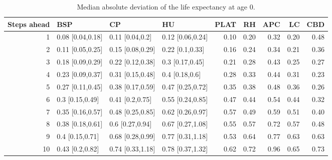 % 
\begin{table}[ht]
\centering
\begin{tabular}{rlllrrrrr}
  \hline
Steps ahead & BSP & CP & HU & PLAT & RH & APC & LC & CBD \\ 
  \hline
  1 & 0.08 [0.04,0.18] & 0.11 [0.04,0.2] & 0.12 [0.06,0.24] & 0.10 & 0.20 & 0.32 & 0.20 & 0.48 \\ 
    2 & 0.11 [0.05,0.25] & 0.15 [0.08,0.29] & 0.22 [0.1,0.33] & 0.16 & 0.24 & 0.34 & 0.21 & 0.36 \\ 
    3 & 0.18 [0.09,0.29] & 0.22 [0.12,0.38] & 0.3 [0.17,0.45] & 0.21 & 0.28 & 0.43 & 0.25 & 0.27 \\ 
    4 & 0.23 [0.09,0.37] & 0.31 [0.15,0.48] & 0.4 [0.18,0.6] & 0.28 & 0.33 & 0.44 & 0.31 & 0.23 \\ 
    5 & 0.27 [0.11,0.45] & 0.38 [0.17,0.59] & 0.47 [0.25,0.72] & 0.35 & 0.38 & 0.48 & 0.36 & 0.26 \\ 
    6 & 0.3 [0.15,0.49] & 0.41 [0.2,0.75] & 0.55 [0.24,0.85] & 0.47 & 0.44 & 0.54 & 0.44 & 0.32 \\ 
    7 & 0.35 [0.16,0.57] & 0.48 [0.25,0.85] & 0.62 [0.26,0.97] & 0.57 & 0.49 & 0.59 & 0.51 & 0.40 \\ 
    8 & 0.38 [0.18,0.61] & 0.6 [0.27,0.94] & 0.67 [0.27,1.08] & 0.55 & 0.57 & 0.72 & 0.57 & 0.48 \\ 
    9 & 0.4 [0.15,0.71] & 0.68 [0.28,0.99] & 0.77 [0.31,1.18] & 0.53 & 0.64 & 0.77 & 0.63 & 0.63 \\ 
   10 & 0.43 [0.2,0.82] & 0.74 [0.33,1.18] & 0.78 [0.37,1.32] & 0.62 & 0.72 & 0.96 & 0.65 & 0.73 \\ 
   \hline
\end{tabular}
\caption{Median absolute deviation of the life expectancy at age 0.} 
\end{table}
